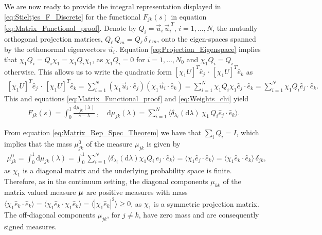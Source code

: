 \documentclass{cmslatex}
\renewcommand{\d}{\text{d}}
\newcommand\bmu{\mbox{\boldmath${\mu}$}}
\begin{document}
We are now ready to provide the integral representation displayed in
\eqref{eq:Stieltjes_F_Discrete} for the functional $F_{jk}(s)$ in
equation \eqref{eq:Matrix_Functional_proof}. Denote by
$Q_i=\vec{u}_i\,\vec{u}_i^{\;T}$, $i=1,\ldots,N$, the mutually orthogonal
projection matrices, $Q_\ell\,Q_m=Q_\ell\,\delta_{\ell m}$, onto the eigen-spaces
spanned by the orthonormal eigenvectors $\vec{u}_i$. Equation
\eqref{eq:Projection_Eigenspace} implies that
$\chi_1Q_i=Q_i\chi_1=\chi_1Q_i\chi_1$, as $\chi_1Q_i=0$ for $i=1,\ldots,N_0$ and
$\chi_1Q_i=Q_i$ otherwise. This allows us to write the quadratic form
$[\chi_1U]^T\hat{e}_j\,\cdot\,[\chi_1U]^T\hat{e}_k$ as  
%
\begin{align}\label{eq:Quadratic_form}
  [\chi_1U]^T\hat{e}_j\,\cdot\,[\chi_1U]^T\hat{e}_k=\sum_{i=1}^N(\chi_1\vec{u}_i\cdot\hat{e}_j)
                                     (\chi_1\vec{u}_i\cdot\hat{e}_k)
                              =\sum_{i=1}^N \chi_1Q_i\chi_1\hat{e}_j\cdot\hat{e}_k
                              =\sum_{i=1}^N \chi_1Q_i\hat{e}_j\cdot\hat{e}_k.
\end{align}
%
This and equations \eqref{eq:Matrix_Functional_proof} and
\eqref{eq:Weights_chi} yield
%
\begin{align}\label{eq:Stieltjes_F_DiscretE}
  F_{jk}(s)=\int_0^1\frac{\d\mu_{jk}(\lambda)}{s-\lambda}\,, \quad
  \d\mu_{jk}(\lambda)=\sum_{i=1}^N\langle \delta_{\lambda_i}(\d\lambda)\;\chi_1\,Q_i\hat{e}_j\cdot\hat{e}_k\rangle.
\end{align}
%



From equation \eqref{eq:Matrix_Rep_Spec_Theorem} we have that
$\sum_iQ_i=I$, which implies that the mass $\mu^0_{jk}$ of the measure
$\mu_{jk}$ is given by
%
\begin{align}\label{eq:Measure_Mass_Lattice}
  \mu^0_{jk}=\int_0^1\d\mu_{jk}(\lambda)
       =\int_0^1\sum_{i=1}^N \langle\delta_{\lambda_i}(\d\lambda)\chi_1Q_i\,\hat{e}_j\cdot\hat{e}_k\rangle
       =\langle\chi_1\hat{e}_j\cdot\hat{e}_k\rangle
       =\langle\chi_1\hat{e}_k\cdot\hat{e}_k\rangle\,\delta_{jk},          
\end{align}
%
as $\chi_1$ is a diagonal matrix and the underlying probability space is
finite. Therefore, as in the continuum setting, the diagonal
components $\mu_{kk}$ of the matrix valued measure $\bmu$ are positive
measures with mass
$\langle\chi_1\hat{e}_k\cdot\hat{e}_k\rangle=\langle\chi_1\hat{e}_k\cdot\chi_1\hat{e}_k\rangle=\langle|\chi_1\hat{e}_k|^2\rangle\geq0$,
as $\chi_1$ is a symmetric projection matrix. The off-diagonal
components $\mu_{jk}$, for $j\neq k$, have zero mass and are consequently
signed measures.
\end{document}
